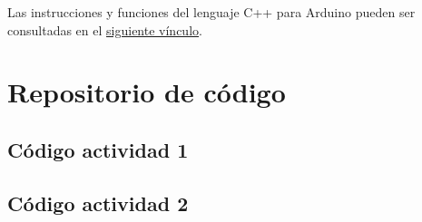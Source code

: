 Las instrucciones y funciones del lenguaje C++ para Arduino pueden ser consultadas en el \href{https://www.arduino.cc/reference/en/}{siguiente vínculo}.


\chapter{Repositorio de código}
\label{ap:osc}
\section{Código actividad 1}
\label{ApendiceA1}
{\scriptsize 
    
}

\section{Código actividad 2}
\label{ApendiceA2}
{\scriptsize 
    
}	